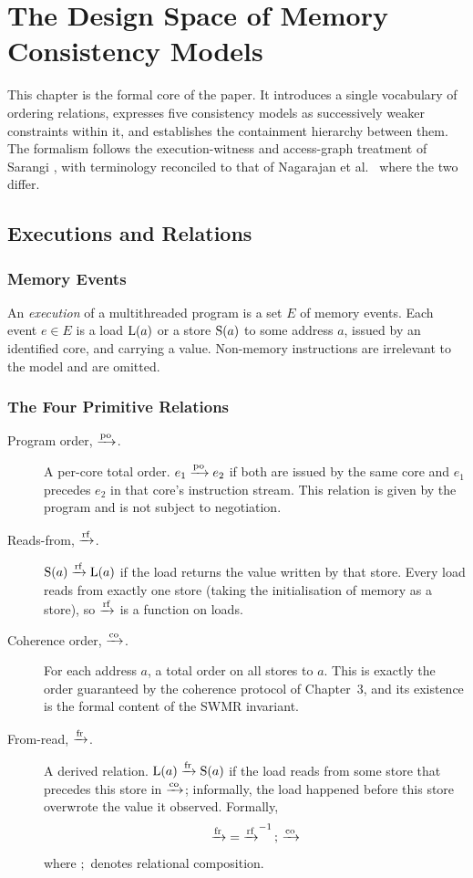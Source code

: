 \chapter{The Design Space of Memory Consistency Models}
\label{ch:models}

This chapter is the formal core of the paper.
It introduces a single vocabulary
of ordering relations, expresses five consistency models as successively weaker
constraints within it, and establishes the containment hierarchy between them.
The formalism follows the execution-witness and access-graph treatment of
Sarangi \cite[Ch.~9]{sarangi2023nextgen}, with terminology reconciled to that of
Nagarajan et al.\ \cite{nagarajan2020primer} where the two differ.

\section{Executions and Relations}
\label{sec:relations}

\subsection{Memory Events}

An \emph{execution} of a multithreaded program is a set $E$ of memory events.
Each event $e \in E$ is a load $\mathrm{L}(a)$ or a store $\mathrm{S}(a)$ to some address $a$,
issued by an identified core, and carrying a value.
Non-memory instructions are
irrelevant to the model and are omitted.

\subsection{The Four Primitive Relations}

\begin{description}
\item[Program order, $\xrightarrow{\text{po}}$.] A per-core total order. $e_1 \xrightarrow{\text{po}} e_2$ if both are
  issued by the same core and $e_1$ precedes $e_2$ in that core's instruction
  stream.
This relation is given by the program and is not subject to negotiation.

\item[Reads-from, $\xrightarrow{\text{rf}}$.] $\mathrm{S}(a) \xrightarrow{\text{rf}} \mathrm{L}(a)$ if the load returns the value
  written by that store.
Every load reads from exactly one store (taking the
  initialisation of memory as a store), so $\xrightarrow{\text{rf}}$ is a function on loads.

\item[Coherence order, $\xrightarrow{\text{co}}$.] For each address $a$, a total order on all stores
  to $a$. This is exactly the order guaranteed by the coherence protocol of
  Chapter~3, and its existence is the formal content of the SWMR invariant.

\item[From-read, $\xrightarrow{\text{fr}}$.] A derived relation. $\mathrm{L}(a) \xrightarrow{\text{fr}} \mathrm{S}(a)$ if the load reads
  from some store that precedes this store in $\xrightarrow{\text{co}}$; informally, the load happened
  before this store overwrote the value it observed. Formally,
  \[
    \xrightarrow{\text{fr}} \;=\; \xrightarrow{\text{rf}}^{-1} \,;\, \xrightarrow{\text{co}}
  \]
  where $;$ denotes relational composition.
\end{description}

